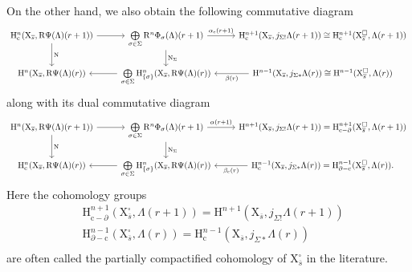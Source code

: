 \documentclass[10pt]{amsart}
\numberwithin{equation}{section}
\theoremstyle{definition}
\def\rmc{\mathrm{c}}
\def\rmH{\mathrm{H}}
\def\rmR{\mathrm{R}}
\def\rmX{\mathrm{X}}
\begin{document}
On the other hand, we also obtain the following commutative diagram
\begin{equation}\label{Pic-Lef-c-no}
\begin{tikzcd}
\mathrm{H}^{n}_{\rmc}(\rmX_{\overline{s}}, \rmR\Psi(\Lambda)(r+1)) \arrow[r] \arrow[d, "\mathrm{N}"] & \bigoplus\limits_{\sigma\in\Sigma}\rmR^{n}\Phi_{\sigma}(\Lambda)(r+1) \arrow[d, "\mathrm{N}_{\Sigma}"]  \arrow[r, "\alpha_{\rmc}(r+1)"] & \mathrm{H}^{n+1}_{\rmc}(\rmX_{\overline{s}}, j_{\Sigma !}\Lambda(r+1))\cong \mathrm{H}^{n+1}_{\rmc}(\rmX^{\square}_{\overline{s}}, \Lambda(r+1))\\
\mathrm{H}^{n}(\rmX_{\overline{s}}, \rmR\Psi(\Lambda)(r)) &\bigoplus\limits_{\sigma\in\Sigma}\rmH^{n}_{\{\sigma\}}(\rmX_{\overline{s}}, \rmR\Psi(\Lambda)(r))  \arrow[l] & \mathrm{H}^{n-1}(\rmX_{\overline{s}}, j_{\Sigma\ast}\Lambda(r))\cong\mathrm{H}^{n-1}(\rmX^{\square}_{\overline{s}}, \Lambda(r))\arrow[l, "\beta(r)"]            
\end{tikzcd}          
\end{equation}
along with its dual commutative diagram
\begin{equation}\label{Pic-Lef-no-c}
\begin{tikzcd}
\mathrm{H}^{n}(\rmX_{\overline{s}}, \rmR\Psi(\Lambda)(r+1)) \arrow[r] \arrow[d, "\mathrm{N}"] & \bigoplus\limits_{\sigma\in\Sigma}\rmR^{n}\Phi_{\sigma}(\Lambda)(r+1) \arrow[d, "\mathrm{N}_{\Sigma}"]  \arrow[r, "\alpha(r+1)"] & \mathrm{H}^{n+1}(\rmX_{\overline{s}}, j_{\Sigma!}\Lambda(r+1))=\mathrm{H}^{n+1}_{\rmc-\partial}(\rmX^{\square}_{\overline{s}}, \Lambda(r+1))\\
\mathrm{H}^{n}_{\rmc}(\rmX_{\overline{s}}, \rmR\Psi(\Lambda)(r)) &\bigoplus\limits_{\sigma\in\Sigma}\rmH^{n}_{\{\sigma\}}(\rmX_{\overline{s}}, \rmR\Psi(\Lambda)(r))  \arrow[l] & \mathrm{H}^{n-1}_{\rmc}(\rmX_{\overline{s}}, j_{\Sigma\ast}\Lambda(r))=\mathrm{H}^{n-1}_{\partial-\rmc}(\rmX^{\square}_{\overline{s}}, \Lambda(r))\arrow[l, "\beta_{\rmc}(r)"].            
\end{tikzcd}          
\end{equation}
Here the cohomology groups
\begin{equation*}
\begin{aligned}
&\mathrm{H}^{n+1}_{\rmc-\partial}(\rmX^{\square}_{\overline{s}}, \Lambda(r+1))=\mathrm{H}^{n+1}(\rmX_{\overline{s}}, j_{\Sigma!}\Lambda(r+1))\\
&\mathrm{H}^{n-1}_{\partial-\rmc}(\rmX^{\square}_{\overline{s}}, \Lambda(r))=\mathrm{H}^{n-1}_{\rmc}(\rmX_{\overline{s}}, j_{\Sigma\ast}\Lambda(r))\\
\end{aligned}
\end{equation*}
are often called the partially compactified cohomology of $\rmX^{\square}_{\overline{s}}$ in the literature.
\end{document}
